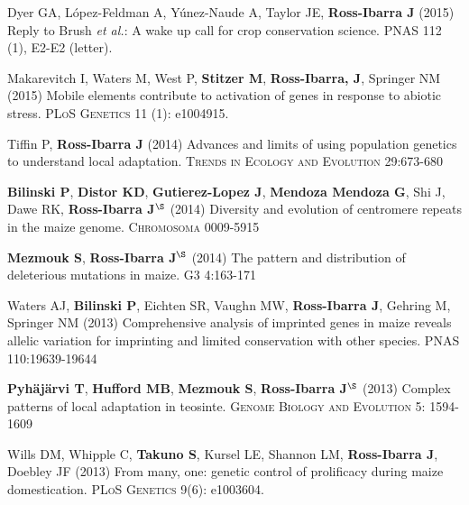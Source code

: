 \documentclass[letterpaper,10pt]{article}
\begin{document}
\begin{etaremune}
\item Dyer GA, L\'opez-Feldman A, Y\'unez-Naude A, Taylor JE, {\bf Ross-Ibarra J} (2015) Reply to Brush \emph{et al.}: A wake up call for crop conservation science. PNAS 112 (1), E2-E2 (letter).


\item Makarevitch I, Waters M, West P, {\bf Stitzer M}, {\bf Ross-Ibarra, J}, Springer NM (2015) Mobile elements contribute to activation of genes in response to abiotic stress. \textsc{PLoS Genetics} 11 (1): e1004915. %


\item Tiffin P, {\bf Ross-Ibarra J} (2014) Advances and limits of using population genetics to understand local adaptation. \textsc{Trends in Ecology and Evolution} 29:673-680 %


\item {\bf Bilinski P}, {\bf Distor KD}, {\bf Gutierez-Lopez J}, {\bf Mendoza Mendoza G}, Shi J, Dawe RK,  {\bf Ross-Ibarra J}$^\S$ (2014) Diversity and evolution of centromere repeats in the maize genome. \textsc{Chromosoma} 0009-5915

\item {\bf Mezmouk S}, {\bf Ross-Ibarra J}$^\S$ (2014) The pattern and distribution of deleterious mutations in maize. \textsc{G3} 4:163-171

\item Waters AJ, {\bf Bilinski P}, Eichten SR, Vaughn MW, {\bf Ross-Ibarra J}, Gehring M, Springer NM (2013) Comprehensive analysis of imprinted genes in maize reveals allelic variation for imprinting and limited conservation with other species. \textsc{PNAS} 110:19639-19644


\item {\bf Pyh\"aj\"arvi T}, {\bf Hufford MB}, {\bf Mezmouk S}, {\bf Ross-Ibarra J}$^\S$ (2013) Complex patterns of local adaptation in teosinte. \textsc{Genome Biology and Evolution} 5: 1594-1609 %


\item Wills DM, Whipple C, {\bf Takuno S}, Kursel LE, Shannon LM, {\bf Ross-Ibarra J}, Doebley JF (2013) From many, one: genetic control of prolificacy during maize domestication. \textsc{PLoS Genetics} 9(6): e1003604. %


\end{etaremune}
\end{document}
